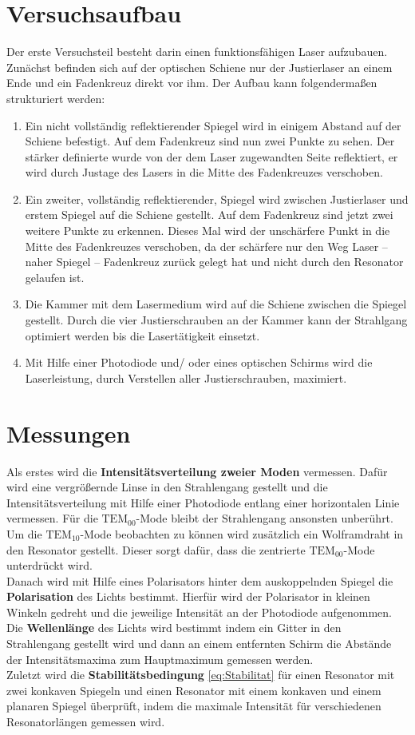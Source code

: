 \section{Versuchsaufbau}
Der erste Versuchsteil besteht darin einen funktionsfähigen Laser aufzubauen. Zunächst befinden sich auf der optischen Schiene nur der Justierlaser an einem Ende und ein Fadenkreuz direkt vor ihm. Der Aufbau kann folgendermaßen strukturiert werden:
\begin{enumerate}
	\item Ein nicht vollständig reflektierender Spiegel wird in einigem Abstand auf der Schiene befestigt. Auf dem Fadenkreuz sind nun zwei Punkte zu sehen. Der stärker definierte wurde von der dem Laser zugewandten Seite reflektiert, er wird durch Justage des Lasers in die Mitte des Fadenkreuzes verschoben.
	\item Ein zweiter, vollständig reflektierender, Spiegel wird zwischen Justierlaser und erstem Spiegel auf die Schiene gestellt. Auf dem Fadenkreuz sind jetzt zwei weitere Punkte zu erkennen. Dieses Mal wird der unschärfere Punkt in die Mitte des Fadenkreuzes verschoben, da der schärfere nur den Weg Laser -- naher Spiegel -- Fadenkreuz zurück gelegt hat und nicht durch den Resonator gelaufen ist.
	\item Die Kammer mit dem Lasermedium wird auf die Schiene zwischen die Spiegel gestellt. Durch die vier Justierschrauben an der Kammer kann der Strahlgang optimiert werden bis die Lasertätigkeit einsetzt.
	\item Mit Hilfe einer Photodiode und/ oder eines optischen Schirms wird die Laserleistung, durch Verstellen aller Justierschrauben, maximiert.
\end{enumerate}

\section{Messungen}
Als erstes wird die \textbf{Intensitätsverteilung zweier Moden} vermessen. Dafür wird eine vergrößernde Linse in den Strahlengang gestellt und die Intensitätsverteilung mit Hilfe einer Photodiode entlang einer horizontalen Linie vermessen. Für die $\text{TEM}_{00}$-Mode bleibt der Strahlengang ansonsten unberührt. Um die $\text{TEM}_{10}$-Mode beobachten zu können wird zusätzlich ein Wolframdraht in den Resonator gestellt. Dieser sorgt dafür, dass die zentrierte $\text{TEM}_{00}$-Mode unterdrückt wird. \\
Danach wird mit Hilfe eines Polarisators hinter dem auskoppelnden Spiegel die \textbf{Polarisation} des Lichts bestimmt. Hierfür wird der Polarisator in kleinen Winkeln gedreht und die jeweilige Intensität an der Photodiode aufgenommen. \\
Die \textbf{Wellenlänge} des Lichts wird bestimmt indem ein Gitter in den Strahlengang gestellt wird und dann an einem entfernten Schirm die Abstände der Intensitätsmaxima zum Hauptmaximum gemessen werden. \\
Zuletzt wird die \textbf{Stabilitätsbedingung} \eqref{eq:Stabilitat} für einen Resonator mit zwei konkaven Spiegeln und einen Resonator mit einem konkaven und einem planaren Spiegel überprüft, indem die maximale Intensität für verschiedenen Resonatorlängen gemessen wird.